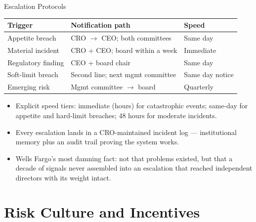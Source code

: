 \documentclass[11pt, aspectratio=169]{beamer}
\begin{document}
\begin{frame}{Escalation Protocols}
\begin{center}\small
\begin{tabular}{@{}lll@{}}
\toprule
\textbf{Trigger} & \textbf{Notification path} & \textbf{Speed} \\
\midrule
Appetite breach & CRO $\rightarrow$ CEO; both committees & Same day \\
Material incident & CRO + CEO; board within a week & Immediate \\
Regulatory finding & CEO + board chair & Same day \\
Soft-limit breach & Second line; next mgmt committee & Same day notice \\
Emerging risk & Mgmt committee $\rightarrow$ board & Quarterly \\
\bottomrule
\end{tabular}
\end{center}
\medskip
\begin{itemize}
  \item Explicit speed tiers: immediate (hours) for catastrophic events; same-day for appetite and hard-limit breaches; 48 hours for moderate incidents.
  \item Every escalation lands in a CRO-maintained incident log --- institutional memory plus an audit trail proving the system works.
  \item Wells Fargo's most damning fact: not that problems existed, but that \alert{a decade of signals never assembled into an escalation} that reached independent directors with its weight intact.
\end{itemize}
\end{frame}

\section{Risk Culture and Incentives}
\end{document}
